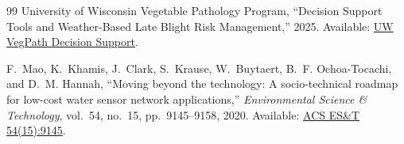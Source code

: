 \documentclass[10pt,twocolumn,a4paper]{article}
\begin{document}
\begin{thebibliography}{99}
University of Wisconsin Vegetable Pathology Program, ``Decision Support Tools and Weather-Based Late Blight Risk Management,'' 2025. Available: \href{https://vegpath.plantpath.wisc.edu/decision-support-tools/weather/}{UW VegPath Decision Support}.

F.~Mao, K.~Khamis, J.~Clark, S.~Krause, W.~Buytaert, B.~F. Ochoa-Tocachi, and D.~M. Hannah, ``Moving beyond the technology: A socio-technical roadmap for low-cost water sensor network applications,'' \textit{Environmental Science \& Technology}, vol.~54, no.~15, pp.~9145--9158, 2020. Available: \href{https://pubs.acs.org/esthag/article/54/15/9145/1648078/Moving-beyond-the-Technology-A-Socio-technical}{ACS ES\&T 54(15):9145}.

\end{thebibliography}
\end{document}
